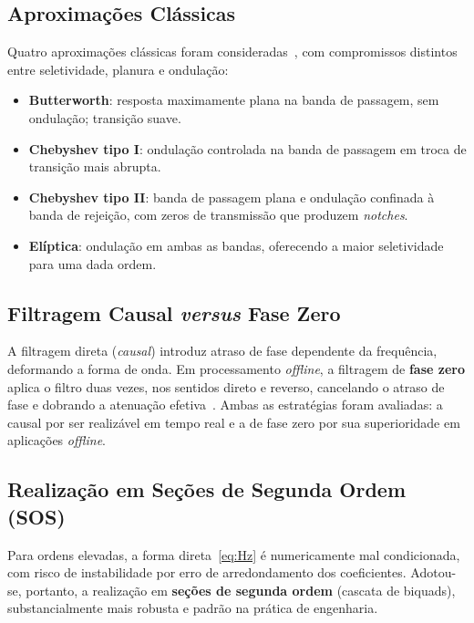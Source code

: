 \documentclass[conference]{IEEEtran}
\begin{document}
\subsection{Aproximações Clássicas}
Quatro aproximações clássicas foram consideradas~\cite{proakis}, com compromissos
distintos entre seletividade, planura e ondulação:
\begin{itemize}
  \item \textbf{Butterworth}: resposta maximamente plana na banda de passagem,
        sem ondulação; transição suave.
  \item \textbf{Chebyshev tipo I}: ondulação controlada na banda de passagem em
        troca de transição mais abrupta.
  \item \textbf{Chebyshev tipo II}: banda de passagem plana e ondulação confinada
        à banda de rejeição, com zeros de transmissão que produzem \emph{notches}.
  \item \textbf{Elíptica}: ondulação em ambas as bandas, oferecendo a maior
        seletividade para uma dada ordem.
\end{itemize}

\subsection{Filtragem Causal \emph{versus} Fase Zero}
A filtragem direta (\emph{causal}) introduz atraso de fase dependente da
frequência, deformando a forma de onda. Em processamento \emph{offline}, a
filtragem de \textbf{fase zero} aplica o filtro duas vezes, nos sentidos direto e
reverso, cancelando o atraso de fase e dobrando a atenuação efetiva~\cite{gustafsson}.
Ambas as estratégias foram avaliadas: a causal por ser realizável em tempo real e a de
fase zero por sua superioridade em aplicações \emph{offline}.

\subsection{Realização em Seções de Segunda Ordem (SOS)}
Para ordens elevadas, a forma direta~\eqref{eq:Hz} é numericamente mal
condicionada, com risco de instabilidade por erro de arredondamento dos
coeficientes. Adotou-se, portanto, a realização em \textbf{seções de segunda
ordem} (cascata de biquads), substancialmente mais robusta e padrão na prática de
engenharia.
\end{document}

